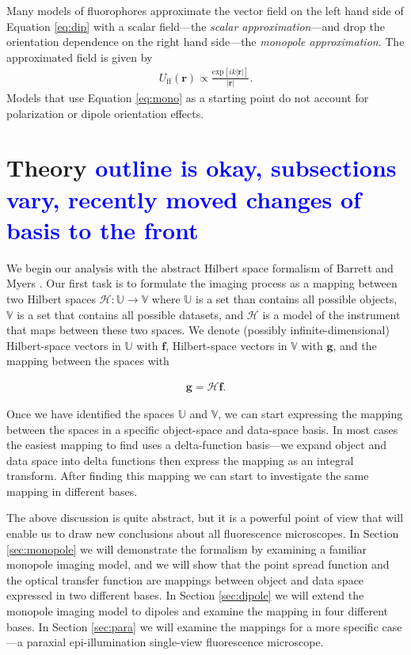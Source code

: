 \documentclass{osa-article}
\providecommand{\mb}[1]{\mathbf{#1}}
\providecommand{\mc}[1]{\mathcal{#1}}
\providecommand{\mbb}[1]{\mathbb{#1}}
\providecommand{\tb}[1]{\textcolor{blue}{#1}}
\begin{document}
Many models of fluorophores approximate the vector field on the left hand side
of Equation \ref{eq:dip} with a scalar field---the \textit{scalar
  approximation}---and drop the orientation dependence on the right hand
side---the \textit{monopole approximation}. The approximated field is given by
\begin{align}
  U_{\text{ff}}(\mb{r}) \propto \frac{\text{exp}[ik|\mb{r}|]}{|\mb{r}|}. \label{eq:mono}
\end{align}
Models that use Equation \ref{eq:mono} as a starting point do not account for
polarization or dipole orientation effects.

\section{Theory \tb{outline is okay, subsections vary, recently moved changes of basis to the front}}
We begin our analysis with the abstract Hilbert space formalism of Barrett and
Myers \cite{barrett2004}. Our first task is to formulate the imaging process as
a mapping between two Hilbert spaces $\mc{H}: \mbb{U} \rightarrow \mbb{V}$ where
$\mbb{U}$ is a set than contains all possible objects, $\mbb{V}$ is a set that
contains all possible datasets, and $\mc{H}$ is a model of the instrument that
maps between these two spaces. We denote (possibly infinite-dimensional)
Hilbert-space vectors in $\mbb{U}$ with $\mb{f}$, Hilbert-space vectors in
$\mbb{V}$ with $\mb{g}$, and the mapping between the spaces with

\begin{align}
  \mb{g} = \mc{H}\mb{f}.
\end{align}

Once we have identified the spaces $\mbb{U}$ and $\mbb{V}$, we can start
expressing the mapping between the spaces in a specific object-space and
data-space basis. In most cases the easiest mapping to find uses a
delta-function basis---we expand object and data space into delta functions then
express the mapping as an integral transform. After finding this mapping we can
start to investigate the same mapping in different bases.

The above discussion is quite abstract, but it is a powerful point of view that
will enable us to draw new conclusions about all fluorescence microscopes. In
Section \ref{sec:monopole} we will demonstrate the formalism by examining a
familiar monopole imaging model, and we will show that the point spread
function and the optical transfer function are mappings between object and data
space expressed in two different bases. In Section \ref{sec:dipole} we will
extend the monopole imaging model to dipoles and examine the mapping in four
different bases. In Section \ref{sec:para} we will examine the mappings for a
more specific case---a paraxial epi-illumination single-view fluorescence
microscope.
\end{document}
